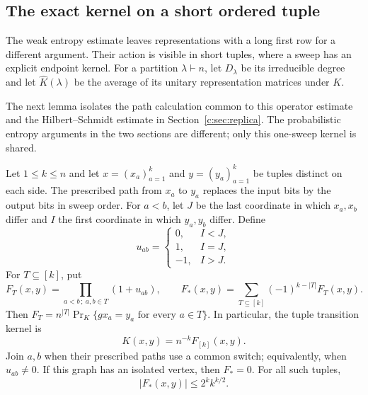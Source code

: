 \subsection{The exact kernel on a short ordered tuple}

The weak entropy estimate leaves representations with a long first
row for a different argument.  Their action is visible in short tuples,
where a sweep has an explicit endpoint kernel.
For a partition $\lambda\vdash n$, let $D_\lambda$ be its irreducible
degree and let $\widehat K(\lambda)$ be the average of its unitary
representation matrices under $K$.

The next lemma isolates the path calculation common to this operator
estimate and the Hilbert--Schmidt estimate in
Section~\ref{c:sec:replica}. The probabilistic entropy arguments in the
two sections are different; only this one-sweep kernel is shared.

\begin{lemma}
\label{lem:c-sweep-kernel}
Let $1\le k\le n$ and let $x=(x_a)_{a=1}^k$ and
$y=(y_a)_{a=1}^k$ be tuples distinct on each side. The prescribed path
from $x_a$ to $y_a$ replaces the input bits by the output bits in
sweep order. For $a<b$, let $J$ be the last
coordinate in which $x_a,x_b$ differ and $I$ the first coordinate in
which $y_a,y_b$ differ.  Define
\[
 u_{ab}=\begin{cases}
 0,&I<J,\\
 1,&I=J,\\
 -1,&I>J.
 \end{cases}
\]
For $T\subseteq[k]$, put
\[
 F_T(x,y)=\prod_{a<b\,;\ a,b\in T}(1+u_{ab}),\qquad
 F_*(x,y)=\sum_{T\subseteq[k]}(-1)^{k-|T|}F_T(x,y).
\]
Then $F_T=n^{|T|}\Pr_K\{g x_a=y_a\text{ for every }a\in T\}$.
In particular, the tuple transition kernel is
\begin{equation}
 K(x,y)=n^{-k}F_{[k]}(x,y).
 \label{eq:c-true-sweep-pair-kernel}
\end{equation}
Join $a,b$ when their prescribed paths use a common switch; equivalently,
when $u_{ab}\ne0$. If this graph has an isolated vertex, then $F_*=0$.
For all such tuples,
\begin{equation}
 |F_*(x,y)|\le 2^k k^{k/2}.
 \label{eq:c-true-sweep-prefix-bound}
\end{equation}
\end{lemma}


